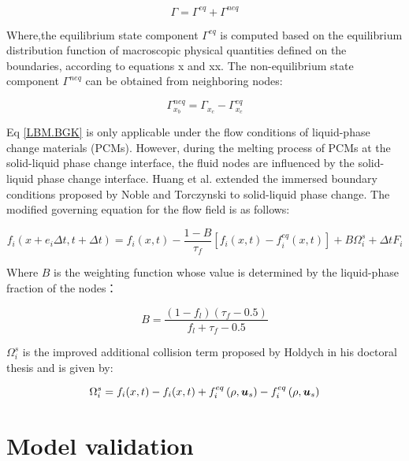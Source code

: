 \begin{equation}\label {LBM.Gamma}
\Gamma=\Gamma^{e q}+\Gamma^{n e q}
\end{equation}\label {LBM.Gamma}

Where,the equilibrium state component $\Gamma^{e q}$ is computed based on the equilibrium distribution function of macroscopic physical quantities defined on the boundaries, according to equations x and xx. The non-equilibrium state component $\Gamma^{n e q}$ can be obtained from neighboring nodes:

\begin{equation}\label {LBM.Gamma-neq}
\Gamma_{x_{b}}^{n e q}=\Gamma_{x_{c}}-\Gamma_{x_{c}}^{e q}
\end{equation}\label {LBM.Gamma-neq}

Eq \ref{LBM.BGK} is only applicable under the flow conditions of liquid-phase change materials (PCMs).  However, during the melting process of PCMs at the solid-liquid phase change interface, the fluid nodes are influenced by the solid-liquid phase change interface.  Huang et al. extended the immersed boundary conditions proposed by Noble and Torczynski to solid-liquid phase change.  The modified governing equation for the flow field is as follows:

\begin{equation}\label {LBM.modified}
f_{i}\left(x+e_{i} \Delta t, t+\Delta t\right)=f_{i}(x, t)-\frac{1-B}{\tau_{f}}\left[f_{i}(x, t)-f_{i}^{e q}(x, t)\right]+B \Omega_{i}^{s}+\Delta t F_{i}
\end{equation}\label {LBM.modified}

Where $B$ is the weighting function whose value is determined by the liquid-phase fraction of the nodes：

\begin{equation}\label {LBM.B}
B=\frac{\left(1-f_{l}\right)\left(\tau_{f}-0.5\right)}{f_{l}+\tau_{f}-0.5}
\end{equation}\label {LBM.B}


$\Omega_{i}^{s}$ is the improved additional collision term proposed by Holdych in his doctoral thesis and is given by:

\begin{equation}\label {LBM.\Omega_{i}^{s}}
\Omega_{i}^{s}=f_{i}(x, t)-f_{i}(x, t)+f_{i}^{e q}\left(\rho, \boldsymbol{u}_{s}\right)-f_{i}^{e q}\left(\rho, \boldsymbol{u}_{s}\right)
\end{equation}\label {LBM.\Omega_{i}^{s}}

\section{Model validation}



